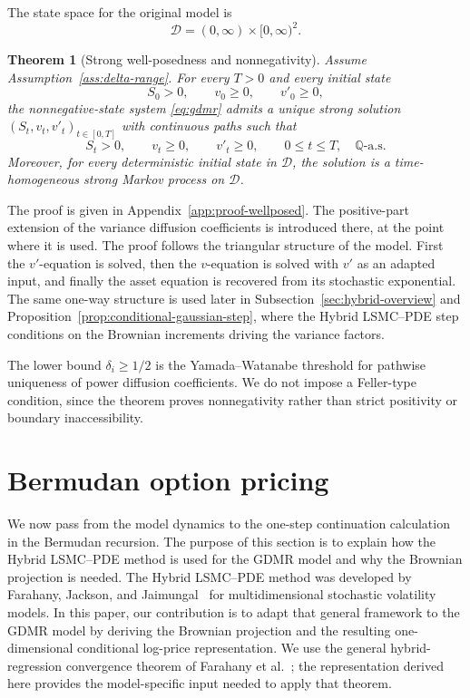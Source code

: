 \documentclass[pdflatex,sn-mathphys-num]{sn-jnl}
\theoremstyle{thmstyleone}%
\newtheorem{theorem}{Theorem}[section]
\theoremstyle{thmstylethree}%
\theoremstyle{thmstyletwo}%
\newcommand{\Q}{\mathbb Q}
\begin{document}
The state space for the original model is
$$
\mathcal D=(0,\infty)\times[0,\infty)^2.
$$

\begin{theorem}[Strong well-posedness and nonnegativity]\label{thm:wellposed}
Assume Assumption~\ref{ass:delta-range}. For every $T>0$ and every initial
state
$$
S_0>0,\qquad v_0\ge0,\qquad v'_0\ge0,
$$
the nonnegative-state system \eqref{eq:gdmr} admits a unique strong solution
$(S_t,v_t,v'_t)_{t\in[0,T]}$ with continuous paths such that
$$
S_t>0,\qquad v_t\ge0,\qquad v'_t\ge0,\qquad
0\le t\le T,\quad \Q\text{-a.s.}
$$
Moreover, for every deterministic initial state in $\mathcal D$, the solution
is a time-homogeneous strong Markov process on $\mathcal D$.
\end{theorem}

The proof is given in Appendix~\ref{app:proof-wellposed}. The positive-part
extension of the variance diffusion coefficients is introduced there, at the
point where it is used. The proof follows the triangular structure of the model.
First the $v'$-equation is solved, then the $v$-equation is solved with $v'$ as
an adapted input, and finally the asset equation is recovered from its
stochastic exponential. The same one-way structure is used later in
Subsection~\ref{sec:hybrid-overview} and
Proposition~\ref{prop:conditional-gaussian-step}, where the Hybrid LSMC--PDE
step conditions on the Brownian increments driving the variance factors.

The lower bound $\delta_i\ge1/2$ is the Yamada--Watanabe threshold for
pathwise uniqueness of power diffusion coefficients. We do not impose a
Feller-type condition, since the theorem proves nonnegativity rather than strict
positivity or boundary inaccessibility.

\section{Bermudan option pricing}\label{sec:conditional_pde}

We now pass from the model dynamics to the one-step continuation calculation in
the Bermudan recursion. The purpose of this section is to explain how the
Hybrid LSMC--PDE method is used for the GDMR model and why the
Brownian projection is needed.
The Hybrid LSMC--PDE method was developed by Farahany, Jackson, and
Jaimungal~\cite{farahany2020mixing} for multidimensional stochastic
volatility models. In this paper, our contribution is to adapt that general
framework to the GDMR model by deriving the Brownian projection and the
resulting one-dimensional conditional log-price representation. We use the
general hybrid-regression convergence theorem of Farahany et
al.~\cite{farahany2020mixing}; the representation derived here provides the
model-specific input needed to apply that theorem.
\end{document}
